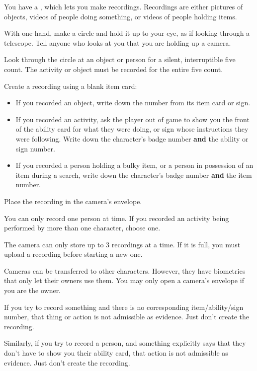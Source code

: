 \documentclass[green]{guildcamp4}
\begin{document}
\name{\gEvidence{}}

You have a \iVideoCamera{\MYname}, which lets you make recordings. Recordings are either pictures of objects, videos of people doing something, or videos of people holding items.
	
\begin{enum}
    \item With one hand, make a circle and hold it up to your eye, as if looking through a telescope. Tell anyone who looks at you that you are holding up a camera.
    \item Look through the circle at an object or person for a silent, interruptible five count. The activity or object must be recorded for the entire five count.
    \item Create a recording using a blank item card:
    \begin{itemize}
    \item If you recorded an object, write down the number from its item card or sign.
    \item If you recorded an activity, ask the player out of game to show you the front of the ability card for what they were doing, or sign whose instructions they were following. Write down the character's badge number {\bf and} the ability or sign number.
    \item If you recorded a person holding a bulky item, or a person in possession of an item during a search, write down the character's badge number {\bf and} the item number.
    \end{itemize}
    \item Place the recording in the camera's envelope.
\end{enum}

\begin{itemz}[Notes]
	\item You can only record one person at time. If you recorded an activity being performed by more than one character, choose one.
	\item The camera can only store up to 3 recordings at a time. If it is full, you must upload a recording before starting a new one. 
	\item Cameras can be transferred to other characters. However, they have biometrics that only let their owners use them. You may only open a camera's envelope if you are the owner.
	\item If you try to record something and there is no corresponding item/ability/sign number, that thing or action is not admissible as evidence. Just don't create the recording.
	\item Similarly, if you try to record a person, and something explicitly says that they don't have to show you their ability card, that action is not admissible as evidence. Just don't create the recording.
\end{itemz}
    
\end{document}
